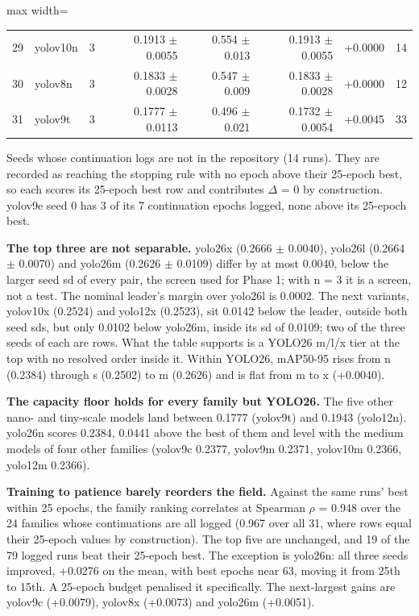\documentclass[10pt]{article}
\begin{document}
\begin{table}[htbp]
\begin{adjustbox}{max width=\linewidth}
\begin{tabular}{rllrrrrr}
29 & yolov10n & 3 & 0.1913 $\pm$ 0.0055 & 0.554 $\pm$ 0.013 & 0.1913 $\pm$ 0.0055 & +0.0000 & 14 \\
30 & yolov8n & 3 & 0.1833 $\pm$ 0.0028 & 0.547 $\pm$ 0.009 & 0.1833 $\pm$ 0.0028 & +0.0000 & 12 \\
31 & yolov9t & 3 & 0.1777 $\pm$ 0.0113 & 0.496 $\pm$ 0.021 & 0.1732 $\pm$ 0.0054 & +0.0045 & 33 \\
\bottomrule
\end{tabular}
\end{adjustbox}
\par\smallskip\raggedright\footnotesize \textdagger{} Seeds whose continuation logs are not in the repository (14 runs). They are recorded as reaching the stopping rule with no epoch above their 25-epoch best, so each scores its 25-epoch best row and contributes $\Delta$ = 0 by construction. yolov9e seed 0 has 3 of its 7 continuation epochs logged, none above its 25-epoch best.
\end{table}
\textbf{The top three are not separable.} yolo26x (0.2666 $\pm$ 0.0040), yolo26l (0.2664 $\pm$ 0.0070) and yolo26m (0.2626 $\pm$ 0.0109) differ by at most 0.0040, below the larger seed sd of every pair, the screen used for Phase 1; with n = 3 it is a screen, not a test. The nominal leader's margin over yolo26l is 0.0002. The next variants, yolov10x (0.2524) and yolo12x (0.2523), sit 0.0142 below the leader, outside both seed sds, but only 0.0102 below yolo26m, inside its sd of 0.0109; two of the three seeds of each are \textdagger{} rows. What the table supports is a YOLO26 m/l/x tier at the top with no resolved order inside it. Within YOLO26, mAP50-95 rises from n (0.2384) through s (0.2502) to m (0.2626) and is flat from m to x (+0.0040).

\textbf{The capacity floor holds for every family but YOLO26.} The five other nano- and tiny-scale models land between 0.1777 (yolov9t) and 0.1943 (yolo12n). yolo26n scores 0.2384, 0.0441 above the best of them and level with the medium models of four other families (yolov9c 0.2377, yolov9m 0.2371, yolov10m 0.2366, yolo12m 0.2366).

\textbf{Training to patience barely reorders the field.} Against the same runs' best within 25 epochs, the family ranking correlates at Spearman $\rho$ = 0.948 over the 24 families whose continuations are all logged (0.967 over all 31, where \textdagger{} rows equal their 25-epoch values by construction). The top five are unchanged, and 19 of the 79 logged runs beat their 25-epoch best. The exception is yolo26n: all three seeds improved, +0.0276 on the mean, with best epochs near 63, moving it from 25th to 15th. A 25-epoch budget penalised it specifically. The next-largest gains are yolov9c (+0.0079), yolov8x (+0.0073) and yolo26m (+0.0051).
\end{document}
